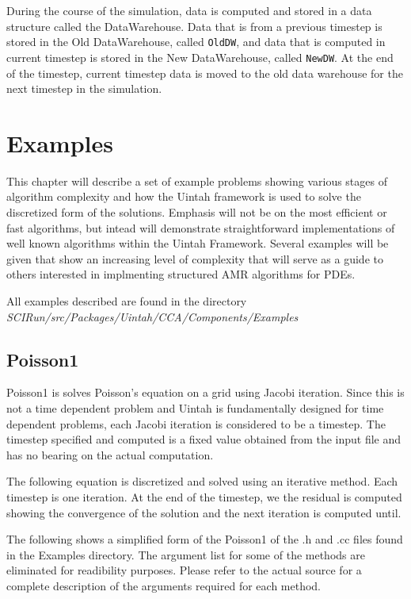 \documentclass[12pt]{report}
\begin{document}
During the course of the simulation, data is computed and stored in a
data structure called the DataWarehouse.  Data that is from a previous
timestep is stored in the Old DataWarehouse, called \texttt{OldDW},
and data that is computed in current timestep is stored in the New
DataWarehouse, called \texttt{NewDW}.  At the end of the timestep,
current timestep data is moved to the old data warehouse for the next
timestep in the simulation.

\chapter{Examples}


This chapter will describe a set of example problems showing various
stages of algorithm complexity and how the Uintah framework is used to
solve the discretized form of the solutions.  Emphasis will not be on
the most efficient or fast algorithms, but intead will demonstrate
straightforward implementations of well known algorithms within the
Uintah Framework.  Several examples will be given that show an
increasing level of complexity that will serve as a guide to others
interested in implmenting structured AMR algorithms for PDEs.

All examples described are found in the directory
\emph{SCIRun/src/Packages/Uintah/CCA/Components/Examples}

\section{Poisson1}

Poisson1 is solves Poisson's equation on a grid using Jacobi
iteration.  Since this is not a time dependent problem and Uintah is
fundamentally designed for time dependent problems, each Jacobi
iteration is considered to be a timestep.  The timestep specified and
computed is a fixed value obtained from the input file and has no
bearing on the actual computation.

The following equation is discretized and solved using an iterative
method. Each timestep is one iteration. At the end of the timestep, we
the residual is computed showing the convergence of the solution and
the next iteration is computed until.

The following shows a simplified form of the Poisson1 of the .h and
.cc files found in the Examples directory.  The argument list for some
of the methods are eliminated for readibility purposes.  Please refer
to the actual source for a complete description of the arguments
required for each method.
\end{document}
